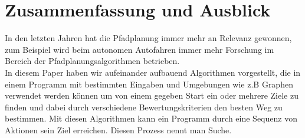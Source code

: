 \chapter{Zusammenfassung und Ausblick}
\label{Zusammenfassung und Ausblick}
In den letzten Jahren hat die Pfadplanung immer mehr an Relevanz gewonnen, zum Beispiel wird beim autonomen Autofahren immer mehr Forschung 
im Bereich der Pfadplanungsalgorithmen betrieben. \cite{Karur:21}
\noindent \\
In diesem Paper haben wir aufeinander aufbauend Algorithmen vorgestellt, die in einem Programm mit bestimmten Eingaben und Umgebungen 
wie z.B Graphen verwendet werden können um von einem gegeben Start ein oder mehrere Ziele zu finden und dabei durch verschiedene Bewertungskriterien den besten Weg zu bestimmen.
Mit diesen Algorithmen kann ein Programm durch eine Sequenz von Aktionen sein Ziel erreichen. Diesen Prozess nennt man Suche.
\cite{Russell:10c}

